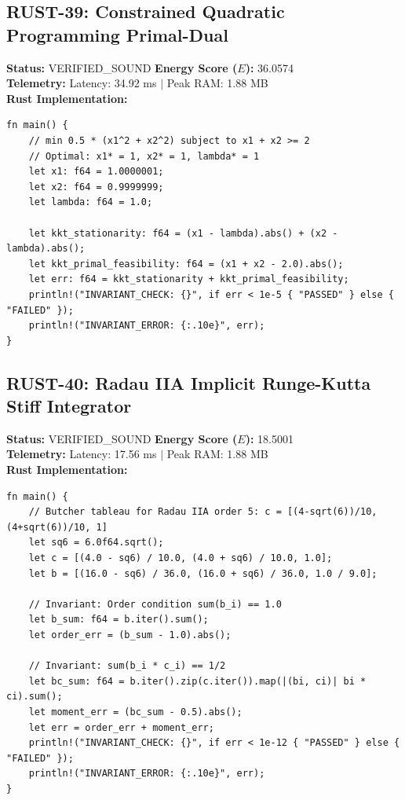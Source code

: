 \documentclass[11pt, a4paper]{article}
\begin{document}
\subsection{RUST-39: Constrained Quadratic Programming Primal-Dual}
\textbf{Status:} VERIFIED\_SOUND \hfill \textbf{Energy Score ($E$):} 36.0574\\
\textbf{Telemetry:} Latency: 34.92 ms $|$ Peak RAM: 1.88 MB\\
\textbf{Rust Implementation:}
\begin{verbatim}
fn main() {
    // min 0.5 * (x1^2 + x2^2) subject to x1 + x2 >= 2
    // Optimal: x1* = 1, x2* = 1, lambda* = 1
    let x1: f64 = 1.0000001;
    let x2: f64 = 0.9999999;
    let lambda: f64 = 1.0;
    
    let kkt_stationarity: f64 = (x1 - lambda).abs() + (x2 - lambda).abs();
    let kkt_primal_feasibility: f64 = (x1 + x2 - 2.0).abs();
    let err: f64 = kkt_stationarity + kkt_primal_feasibility;
    println!("INVARIANT_CHECK: {}", if err < 1e-5 { "PASSED" } else { "FAILED" });
    println!("INVARIANT_ERROR: {:.10e}", err);
}
\end{verbatim}

\subsection{RUST-40: Radau IIA Implicit Runge-Kutta Stiff Integrator}
\textbf{Status:} VERIFIED\_SOUND \hfill \textbf{Energy Score ($E$):} 18.5001\\
\textbf{Telemetry:} Latency: 17.56 ms $|$ Peak RAM: 1.88 MB\\
\textbf{Rust Implementation:}
\begin{verbatim}
fn main() {
    // Butcher tableau for Radau IIA order 5: c = [(4-sqrt(6))/10, (4+sqrt(6))/10, 1]
    let sq6 = 6.0f64.sqrt();
    let c = [(4.0 - sq6) / 10.0, (4.0 + sq6) / 10.0, 1.0];
    let b = [(16.0 - sq6) / 36.0, (16.0 + sq6) / 36.0, 1.0 / 9.0];
    
    // Invariant: Order condition sum(b_i) == 1.0
    let b_sum: f64 = b.iter().sum();
    let order_err = (b_sum - 1.0).abs();
    
    // Invariant: sum(b_i * c_i) == 1/2
    let bc_sum: f64 = b.iter().zip(c.iter()).map(|(bi, ci)| bi * ci).sum();
    let moment_err = (bc_sum - 0.5).abs();
    let err = order_err + moment_err;
    println!("INVARIANT_CHECK: {}", if err < 1e-12 { "PASSED" } else { "FAILED" });
    println!("INVARIANT_ERROR: {:.10e}", err);
}
\end{verbatim}
\end{document}
